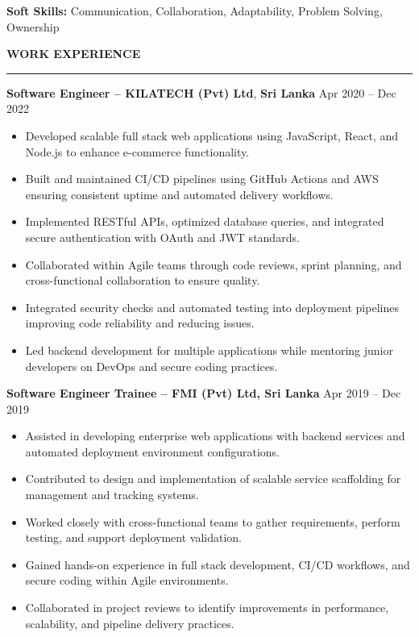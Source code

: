 \documentclass[10pt,letterpaper]{article}
\begin{document}
\textbf{Soft Skills:} Communication, Collaboration, Adaptability, Problem Solving, Ownership

\vspace{8pt}

\textbf{WORK EXPERIENCE}\\[-8pt]
\noindent\rule{\textwidth}{1pt}

\vspace{-2pt}

\textbf{Software Engineer -- KILATECH (Pvt) Ltd}, \textbf{Sri Lanka} \hfill Apr 2020 -- Dec 2022

\vspace{-1pt}

\begin{itemize}
\item Developed scalable full stack web applications using JavaScript, React, and Node.js to enhance e-commerce functionality.
\item Built and maintained CI/CD pipelines using GitHub Actions and AWS ensuring consistent uptime and automated delivery workflows.
\item Implemented RESTful APIs, optimized database queries, and integrated secure authentication with OAuth and JWT standards.
\item Collaborated within Agile teams through code reviews, sprint planning, and cross-functional collaboration to ensure quality.
\item Integrated security checks and automated testing into deployment pipelines improving code reliability and reducing issues.
\item Led backend development for multiple applications while mentoring junior developers on DevOps and secure coding practices.
\end{itemize}

\textbf{Software Engineer Trainee -- FMI (Pvt) Ltd, Sri Lanka} \hfill Apr 2019 -- Dec 2019

\vspace{-1pt}

\begin{itemize}
\item Assisted in developing enterprise web applications with backend services and automated deployment environment configurations.
\item Contributed to design and implementation of scalable service scaffolding for management and tracking systems.
\item Worked closely with cross-functional teams to gather requirements, perform testing, and support deployment validation.
\item Gained hands-on experience in full stack development, CI/CD workflows, and secure coding within Agile environments.
\item Collaborated in project reviews to identify improvements in performance, scalability, and pipeline delivery practices.
\end{itemize}
\end{document}
